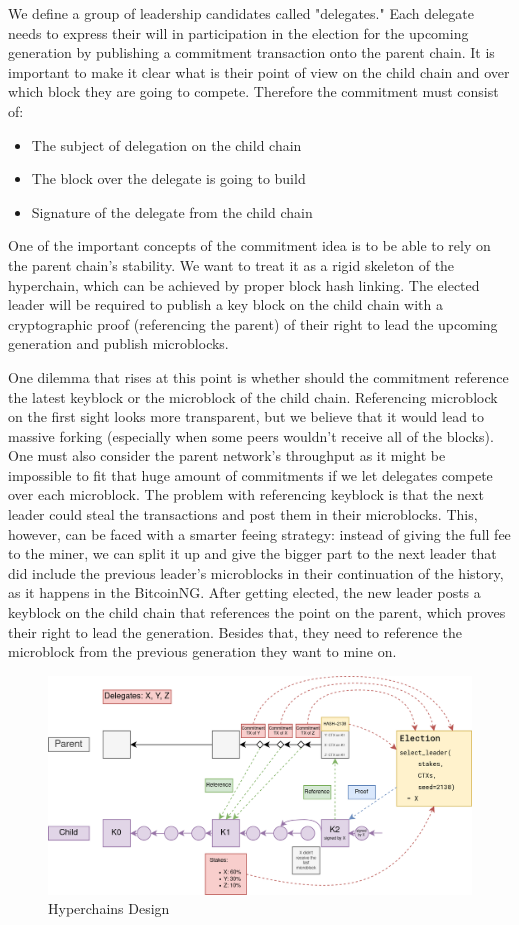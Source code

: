 We define a group of leadership candidates called "delegates." Each delegate
needs to express their will in participation in the election for the upcoming
generation by publishing a commitment transaction onto the parent chain. It is
important to make it clear what is their point of view on the child chain and
over which block they are going to compete.
Therefore the commitment must consist of:
\begin{itemize}
\item The subject of delegation on the child chain
\item The block over the delegate is going to build
\item Signature of the delegate from the child chain
\end{itemize}

One of the important concepts of the commitment idea is to be able to rely on
the parent chain's stability. We want to treat it as a rigid skeleton
of the hyperchain, which can be achieved by proper block hash linking. The
elected leader will be required to publish a key block on the child chain with a
cryptographic proof (referencing the parent) of their right to lead the
upcoming generation and publish microblocks.

One dilemma that rises at this point is whether should the commitment reference
the latest keyblock or the microblock of the child chain. Referencing microblock
on the first sight looks more transparent, but we believe that it would
lead to massive forking (especially when some peers wouldn't receive all of the
blocks). One must also consider the parent network's throughput as it might be
impossible to fit that huge amount of commitments if we let delegates compete
over each microblock.
The problem with referencing keyblock is that the next leader could
steal the transactions and post them in their microblocks. This, however, can be
faced with a smarter feeing strategy: instead of giving the full fee to the
miner, we can split it up and give the bigger part to the next leader that did
include the previous leader's microblocks in their continuation of the history,
as it happens in the BitcoinNG\cite{incentive_bcng}.
After getting elected, the new leader posts a keyblock on the child chain that
references the point on the parent, which proves their right to lead the
generation. Besides that, they need to reference the microblock from the previous
generation they want to mine on.


\begin{figure}[h]
	\caption{Hyperchains Design}
	\centering
	\includegraphics[scale=0.4]{hyperchains_design}
\end{figure}
